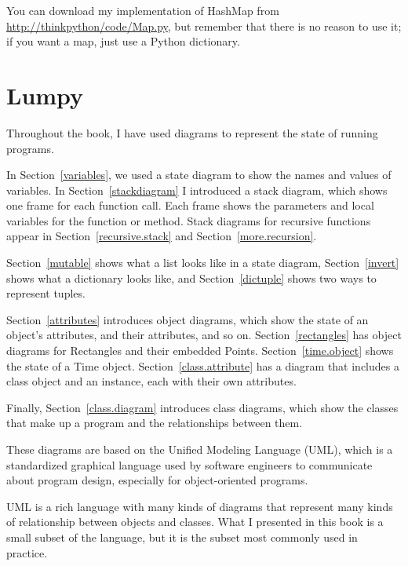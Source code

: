 \documentclass[10pt]{book}
\begin{document}
You can download my implementation of HashMap from
\url{http://thinkpython/code/Map.py}, but remember that there
is no reason to use it; if you want a map, just use a Python dictionary.






\chapter{Lumpy}
\label{lumpy}

Throughout the book, I have used diagrams to represent the state of
running programs.

In Section~\ref{variables}, we used a state diagram to show the names
and values of variables.  In Section~\ref{stackdiagram} I introduced a
stack diagram, which shows one frame for each function call.  Each
frame shows the parameters and local variables for the function or
method.  Stack diagrams for recursive functions appear in
Section~\ref{recursive.stack} and Section~\ref{more.recursion}.
 
 

Section~\ref{mutable} shows what a list looks like in a state diagram,
Section~\ref{invert} shows what a dictionary looks like, and
Section~\ref{dictuple} shows two ways to represent tuples.

Section~\ref{attributes} introduces object diagrams, which show the
state of an object's attributes, and their attributes, and so on.
Section~\ref{rectangles} has object diagrams for Rectangles and
their embedded Points.  Section~\ref{time.object} shows the state
of a Time object.
Section~\ref{class.attribute} has a diagram that includes a class
object and an instance, each with their own attributes.

Finally, Section~\ref{class.diagram} introduces class diagrams,
which show the classes that make up a program and the relationships
between them.

These diagrams are based on the Unified Modeling Language (UML), which
is a standardized graphical language used by software engineers
to communicate about program design, especially for object-oriented
programs.

UML is a rich language with many kinds of diagrams that represent
many kinds of relationship between objects and classes.  What I presented
in this book is a small subset of the language, but it is the subset
most commonly used in practice.
\end{document}
